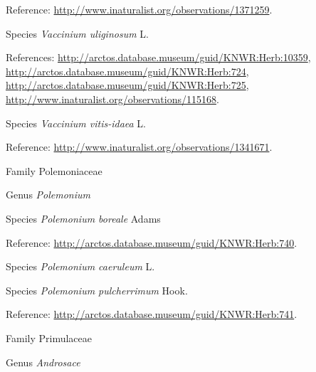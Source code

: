 \documentclass[9pt, article]{memoir}
\begin{document}
\begin{multicols}{2}
\vspace{6pt}Reference: 
\url{http://www.inaturalist.org/observations/1371259}.

\vspace{6pt}\noindent\hspace{36pt}Species \textit{Vaccinium uliginosum} L.


\vspace{6pt}References: 
\url{http://arctos.database.museum/guid/KNWR:Herb:10359}, 
\url{http://arctos.database.museum/guid/KNWR:Herb:724}, 
\url{http://arctos.database.museum/guid/KNWR:Herb:725}, 
\url{http://www.inaturalist.org/observations/115168}.

\vspace{6pt}\noindent\hspace{36pt}Species \textit{Vaccinium vitis-idaea} L.


\vspace{6pt}Reference: 
\url{http://www.inaturalist.org/observations/1341671}.

\vspace{6pt}\noindent\hspace{24pt}Family Polemoniaceae


\vspace{6pt}\noindent\hspace{30pt}Genus \textit{Polemonium}


\vspace{6pt}\noindent\hspace{36pt}Species \textit{Polemonium boreale} Adams


\vspace{6pt}Reference: 
\url{http://arctos.database.museum/guid/KNWR:Herb:740}.

\vspace{6pt}\noindent\hspace{36pt}Species \textit{Polemonium caeruleum} L.


\vspace{6pt}\noindent\hspace{36pt}Species \textit{Polemonium pulcherrimum} Hook.


\vspace{6pt}Reference: 
\url{http://arctos.database.museum/guid/KNWR:Herb:741}.

\vspace{6pt}\noindent\hspace{24pt}Family Primulaceae


\vspace{6pt}\noindent\hspace{30pt}Genus \textit{Androsace}



\end{multicols}
\end{document}
